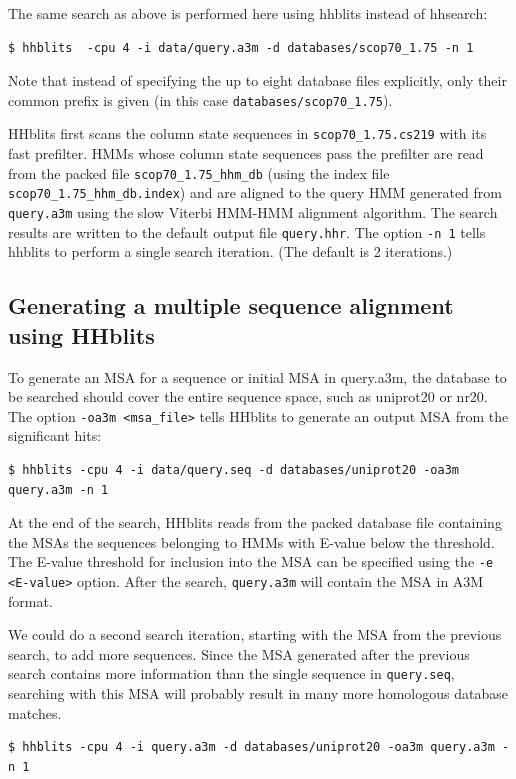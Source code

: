 \documentclass[11pt,a4paper]{article}
\begin{document}
The same search as above is performed here using hhblits instead of hhsearch:
\begin{verbatim}
$ hhblits  -cpu 4 -i data/query.a3m -d databases/scop70_1.75 -n 1
\end{verbatim}
Note that instead of specifying the up to eight database files explicitly, only their common prefix
is given (in this case \verb`databases/scop70_1.75`).

HHblits first scans the column state sequences in \verb`scop70_1.75.cs219` with its fast prefilter. HMMs whose column state sequences pass the prefilter are read from the packed file \verb`scop70_1.75_hhm_db` (using the index file \verb`scop70_1.75_hhm_db.index`) and are aligned to the query HMM generated from \verb`query.a3m` using the slow Viterbi HMM-HMM alignment algorithm. The search results are written to the default output file \verb`query.hhr`. The option \verb`-n 1` tells hhblits to perform a single search iteration. (The default is 2 iterations.)


\subsection{Generating a multiple sequence alignment using HHblits}\label{msa_hhblits}

To generate an MSA for a sequence or initial MSA in query.a3m, the database to be searched should cover the entire sequence space, such as uniprot20 or nr20. The option \verb`-oa3m <msa_file>` tells HHblits to generate an output MSA from the significant hits:
\begin{verbatim}
$ hhblits -cpu 4 -i data/query.seq -d databases/uniprot20 -oa3m query.a3m -n 1
\end{verbatim}

At the end of the search, HHblits reads from the packed database file containing the MSAs the sequences belonging to HMMs with E-value below the threshold. The E-value threshold for inclusion into the MSA can be specified using the \verb`-e <E-value>` option. After the search, \verb`query.a3m` will contain the MSA in A3M format. 

We could do a second search iteration, starting with the MSA from the previous search, to add more sequences. Since the MSA generated after the previous search contains more information than the single sequence in \verb`query.seq`, searching with this MSA will probably result in many more homologous database matches.
\begin{verbatim}
$ hhblits -cpu 4 -i query.a3m -d databases/uniprot20 -oa3m query.a3m -n 1
\end{verbatim}
\end{document}
